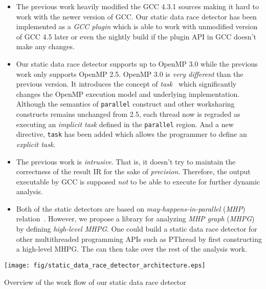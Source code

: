 \begin{itemize}
	\item The previous work heavily modified the GCC 4.3.1 sources making it hard to work with the newer version of GCC. Our static data race detector has been implemented as a \textit{GCC plugin} which is able to work with unmodified version of GCC 4.5 later or even the nightly build if the plugin API in GCC doesn't make any changes.
	\item Our static data race detector supports up to OpenMP 3.0 while the previous work only supports OpenMP 2.5. OpenMP 3.0 is \textit{very different} than the previous version. It introduces the concept of \textit{task}~\cite{Ayguade:2009p1203} which significantly changes the OpenMP execution model and underlying implementation. Although the semantics of \verb|parallel| construct and other worksharing constructs remains unchanged from 2.5, each thread now is regraded as executing an \textit{implicit task} defined in the \verb|parallel| region. And a new directive, \verb|task| has been added which allows the programmer to define an \textit{explicit task}.
	\item The previous work is \textit{intrusive}. That is, it doesn't try to maintain the correctness of the result IR for the sake of \textit{precision}. Therefore, the output executable by GCC is supposed \textit{not} to be able to execute for further dynamic analysis.
	\item Both of the static detectors are based on \textit{may-happens-in-parallel} (\textit{MHP}) relation~\cite{Naumovich:1999p821}. However, we propose a library  for analyzing \textit{MHP graph} (\textit{MHPG}) by defining \textit{high-level MHPG}. One could build a static data race detector for other multithreaded programming APIs such as PThread by first constructing a high-level MHPG. The  can then take over the rest of the analysis work.
\end{itemize}

\begin{center-figure}
	\texttt{[image: fig/static\_data\_race\_detector\_architecture.eps]}
	\caption{Overview of the work flow of our static data race detector}
	\label{fig:Static_Data_Race_Detector_Architecture}
\end{center-figure}

